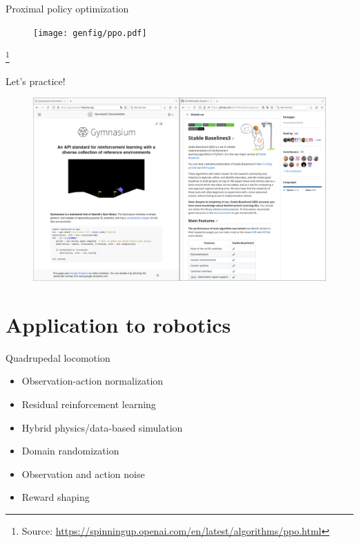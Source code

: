 \documentclass[11pt, aspectratio=169]{beamer}
\newcommand\blfootnote[1]{%
  \begingroup
  \renewcommand\thefootnote{}%
  \footnote{#1}%
  \addtocounter{footnote}{-1}%
  \endgroup
}
\begin{document}
\begin{frame}{Proximal policy optimization}
    \begin{figure}
        \texttt{[image: genfig/ppo.pdf]}
    \end{figure}
    \vspace{-0.5cm}
    \blfootnote{
        Source: \url{https://spinningup.openai.com/en/latest/algorithms/ppo.html}
    }
\end{frame}

\begin{frame}{Let's practice!}
    \begin{figure}
        \includegraphics[width=0.99\columnwidth]{figures/gymnasium-sb3.png}
    \end{figure}
\end{frame}

\section{Application to robotics}

\begin{frame}{Quadrupedal locomotion~\cite{lee2020}}
    \begin{itemize}
        \item Observation-action normalization
        \item Residual reinforcement learning
        \item Hybrid physics/data-based simulation
        \item Domain randomization
        \item Observation and action noise
        \item Reward shaping
    \end{itemize}
\end{frame}
\end{document}
